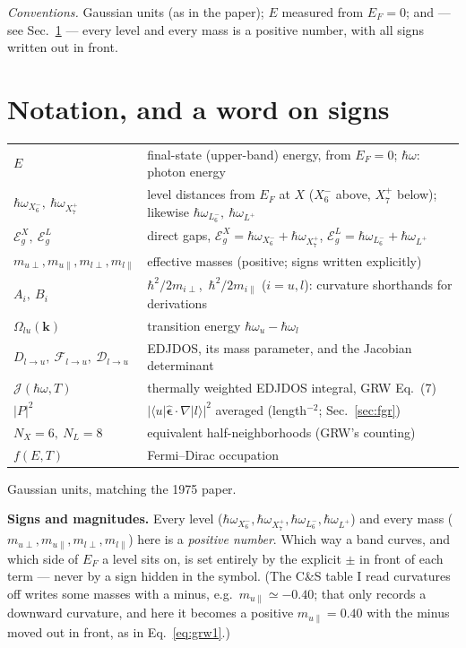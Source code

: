 \documentclass[11pt,a4paper]{article}
\numberwithin{equation}{section}
\newcommand{\hw}{\hbar\omega}
\newcommand{\EgX}{\mathcal{E}_g^{X}}
\newcommand{\EgL}{\mathcal{E}_g^{L}}
\newcommand{\cD}{\mathcal{D}}
\newcommand{\cF}{\mathcal{F}}
\newcommand{\cJ}{\mathcal{J}}%
\newcommand{\wXsix}{\hbar\omega_{X_6^-}}
\newcommand{\wXseven}{\hbar\omega_{X_7^+}}
\newcommand{\wLsix}{\hbar\omega_{L_6^-}}
\newcommand{\wLplus}{\hbar\omega_{L^+}}
\begin{document}
\medskip
\noindent\emph{Conventions.} Gaussian units (as in the paper); $E$
measured from $E_F=0$; and --- see Sec.~\ref{sec:notation} --- every
level and every mass is a positive number, with all signs written out
in front.

\tableofcontents

\section{Notation, and a word on signs}\label{sec:notation}

\begin{center}
\small
\begin{tabular}{ll}
\toprule
$E$ & final-state (upper-band) energy, from $E_F=0$; $\hw$: photon energy\\
$\wXsix,\ \wXseven$ & level distances from $E_F$ at $X$
  ($X_6^-$ above, $X_7^+$ below); likewise $\wLsix,\ \wLplus$\\
$\EgX,\ \EgL$ & direct gaps, $\EgX=\wXsix+\wXseven$,
  $\EgL=\wLsix+\wLplus$\\
$m_{u\perp},m_{u\parallel},m_{l\perp},m_{l\parallel}$ &
  effective masses (positive; signs written explicitly)\\
$A_i,\ B_i$ & $\hbar^2/2m_{i\perp}$,\ $\hbar^2/2m_{i\parallel}$
  ($i=u,l$): curvature shorthands for derivations\\
$\Omega_{lu}(\mathbf k)$ & transition energy
  $\hbar\omega_u-\hbar\omega_l$\\
$D_{l\to u},\ \cF_{l\to u},\ \cD_{l\to u}$ & EDJDOS, its mass
  parameter, and the Jacobian determinant\\
$\cJ(\hw,T)$ & thermally weighted EDJDOS integral, GRW Eq.~(7)\\
$|P|^2$ & $|\langle u|\hat{\bm\epsilon}\!\cdot\!\nabla|l\rangle|^2$
  averaged (length$^{-2}$; Sec.~\ref{sec:fgr})\\
$N_X=6,\ N_L=8$ & equivalent half-neighborhoods (GRW's counting)\\
$f(E,T)$ & Fermi--Dirac occupation\\
\bottomrule
\end{tabular}
\end{center}

\noindent Gaussian units, matching the 1975 paper.

\medskip
\noindent\textbf{Signs and magnitudes.} Every level
($\wXsix,\wXseven,\wLsix,\wLplus$) and every mass
($m_{u\perp},m_{u\parallel},m_{l\perp},m_{l\parallel}$) here is a
\emph{positive number}. Which way a band curves, and which side of
$E_F$ a level sits on, is set entirely by the explicit $\pm$ in front
of each term --- never by a sign hidden in the symbol. (The C\&S table
I read curvatures off writes some masses with a minus, e.g.\
$m_{u\parallel}\simeq-0.40$; that only records a downward curvature,
and here it becomes a positive $m_{u\parallel}=0.40$ with the minus
moved out in front, as in Eq.~\eqref{eq:grw1}.)
\end{document}
